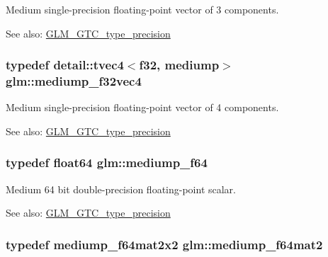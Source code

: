 Medium single-precision floating-point vector of 3 components. \begin{Desc}
\item[See also:]\hyperlink{group__gtc__type__precision}{GLM\_\-GTC\_\-type\_\-precision} \end{Desc}
\hypertarget{group__gtc__type__precision_ga5a1b058d185d87504591a11c6247518}{
\subsubsection[mediump\_\-f32vec4]{\setlength{\rightskip}{0pt plus 5cm}typedef detail::tvec4$<$f32, mediump$>$ {\bf glm::mediump\_\-f32vec4}}}
\label{group__gtc__type__precision_ga5a1b058d185d87504591a11c6247518}


Medium single-precision floating-point vector of 4 components. \begin{Desc}
\item[See also:]\hyperlink{group__gtc__type__precision}{GLM\_\-GTC\_\-type\_\-precision} \end{Desc}
\hypertarget{group__gtc__type__precision_gbd273bd38ea5e013aeec9ffd2b2591fb}{
\subsubsection[mediump\_\-f64]{\setlength{\rightskip}{0pt plus 5cm}typedef float64 {\bf glm::mediump\_\-f64}}}
\label{group__gtc__type__precision_gbd273bd38ea5e013aeec9ffd2b2591fb}


Medium 64 bit double-precision floating-point scalar. \begin{Desc}
\item[See also:]\hyperlink{group__gtc__type__precision}{GLM\_\-GTC\_\-type\_\-precision} \end{Desc}
\hypertarget{group__gtc__type__precision_ga7eac0340d2aaf670ec4dfbd1826fd35}{
\subsubsection[mediump\_\-f64mat2]{\setlength{\rightskip}{0pt plus 5cm}typedef mediump\_\-f64mat2x2 {\bf glm::mediump\_\-f64mat2}}}
\label{group__gtc__type__precision_ga7eac0340d2aaf670ec4dfbd1826fd35}


